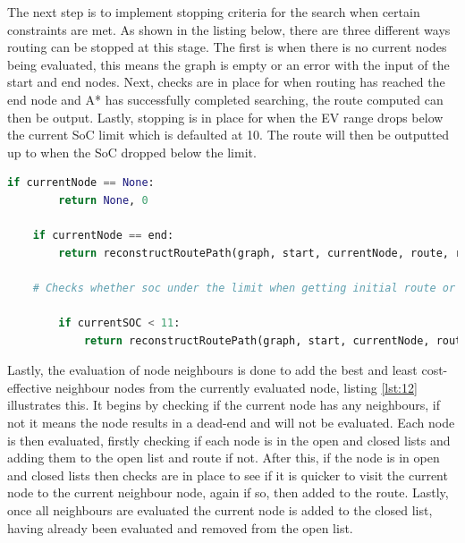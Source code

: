 \documentclass[11pt]{report}
\begin{document}
The next step is to implement stopping criteria for the search when certain constraints are met. As shown in the listing below, there are three different ways routing can be stopped at this stage. The first is when there is no current nodes being evaluated, this means the graph is empty or an error with the input of the start and end nodes. Next, checks are in place for when routing has reached the end node and A* has successfully completed searching, the route computed can then be output. Lastly, stopping is in place for when the EV range drops below the current SoC limit which is defaulted at 10. The route will then be outputted up to when the SoC dropped below the limit.

\begin{lstlisting}[language=Python, caption=Stopping criteria for A*, label={lst:11}]
    if currentNode == None:
        return None, 0

    if currentNode == end:
        return reconstructRoutePath(graph, start, currentNode, route, routeLength)

    # Checks whether soc under the limit when getting initial route or route from C

        if currentSOC < 11:
            return reconstructRoutePath(graph, start, currentNode, route, routeLength)
\end{lstlisting}

Lastly, the evaluation of node neighbours is done to add the best and least cost-effective neighbour nodes from the currently evaluated node, listing \ref{lst:12} illustrates this. It begins by checking if the current node has any neighbours, if not it means the node results in a dead-end and will not be evaluated. Each node is then evaluated, firstly checking if each node is in the open and closed lists and adding them to the open list and route if not. After this, if the node is in open and closed lists then checks are in place to see if it is quicker to visit the current node to the current neighbour node, again if so, then added to the route. Lastly, once all neighbours are evaluated the current node is added to the closed list, having already been evaluated and removed from the open list.
\end{document}
